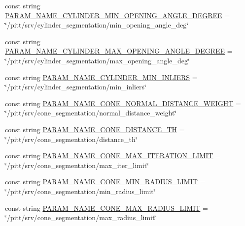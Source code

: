 \begin{DoxyCompactItemize}
const string \hyperlink{namespacesrvm_a3033f0baf12b9ba742cbb14be2f9516b}{P\-A\-R\-A\-M\-\_\-\-N\-A\-M\-E\-\_\-\-C\-Y\-L\-I\-N\-D\-E\-R\-\_\-\-M\-I\-N\-\_\-\-O\-P\-E\-N\-I\-N\-G\-\_\-\-A\-N\-G\-L\-E\-\_\-\-D\-E\-G\-R\-E\-E} = \char`\"{}/pitt/srv/cylinder\-\_\-segmentation/min\-\_\-opening\-\_\-angle\-\_\-deg\char`\"{}
\item 
const string \hyperlink{namespacesrvm_ae8a34e53f1f93958a83db46e8b57b4f0}{P\-A\-R\-A\-M\-\_\-\-N\-A\-M\-E\-\_\-\-C\-Y\-L\-I\-N\-D\-E\-R\-\_\-\-M\-A\-X\-\_\-\-O\-P\-E\-N\-I\-N\-G\-\_\-\-A\-N\-G\-L\-E\-\_\-\-D\-E\-G\-R\-E\-E} = \char`\"{}/pitt/srv/cylinder\-\_\-segmentation/max\-\_\-opening\-\_\-angle\-\_\-deg\char`\"{}
\item 
const string \hyperlink{namespacesrvm_a1cf16bab1dafeefe6d5f6a58432ecbc0}{P\-A\-R\-A\-M\-\_\-\-N\-A\-M\-E\-\_\-\-C\-Y\-L\-I\-N\-D\-E\-R\-\_\-\-M\-I\-N\-\_\-\-I\-N\-L\-I\-E\-R\-S} = \char`\"{}/pitt/srv/cylinder\-\_\-segmentation/min\-\_\-inliers\char`\"{}
\item 
const string \hyperlink{namespacesrvm_a6d02fc836a0b8eb1e6cd8a03e12758d7}{P\-A\-R\-A\-M\-\_\-\-N\-A\-M\-E\-\_\-\-C\-O\-N\-E\-\_\-\-N\-O\-R\-M\-A\-L\-\_\-\-D\-I\-S\-T\-A\-N\-C\-E\-\_\-\-W\-E\-I\-G\-H\-T} = \char`\"{}/pitt/srv/cone\-\_\-segmentation/normal\-\_\-distance\-\_\-weight\char`\"{}
\item 
const string \hyperlink{namespacesrvm_aeec863664b339e3c4808736477fe1378}{P\-A\-R\-A\-M\-\_\-\-N\-A\-M\-E\-\_\-\-C\-O\-N\-E\-\_\-\-D\-I\-S\-T\-A\-N\-C\-E\-\_\-\-T\-H} = \char`\"{}/pitt/srv/cone\-\_\-segmentation/distance\-\_\-th\char`\"{}
\item 
const string \hyperlink{namespacesrvm_a247e146bdc00ad4dc26a1b521b3eb53b}{P\-A\-R\-A\-M\-\_\-\-N\-A\-M\-E\-\_\-\-C\-O\-N\-E\-\_\-\-M\-A\-X\-\_\-\-I\-T\-E\-R\-A\-T\-I\-O\-N\-\_\-\-L\-I\-M\-I\-T} = \char`\"{}/pitt/srv/cone\-\_\-segmentation/max\-\_\-iter\-\_\-limit\char`\"{}
\item 
const string \hyperlink{namespacesrvm_a2d22b702cf298b11c0a70ab4fa90555e}{P\-A\-R\-A\-M\-\_\-\-N\-A\-M\-E\-\_\-\-C\-O\-N\-E\-\_\-\-M\-I\-N\-\_\-\-R\-A\-D\-I\-U\-S\-\_\-\-L\-I\-M\-I\-T} = \char`\"{}/pitt/srv/cone\-\_\-segmentation/min\-\_\-radius\-\_\-limit\char`\"{}
\item 
const string \hyperlink{namespacesrvm_a684755d042c9407cf88fcc81ca6a5712}{P\-A\-R\-A\-M\-\_\-\-N\-A\-M\-E\-\_\-\-C\-O\-N\-E\-\_\-\-M\-A\-X\-\_\-\-R\-A\-D\-I\-U\-S\-\_\-\-L\-I\-M\-I\-T} = \char`\"{}/pitt/srv/cone\-\_\-segmentation/max\-\_\-radius\-\_\-limit\char`\"{}
\item 

\end{DoxyCompactItemize}
